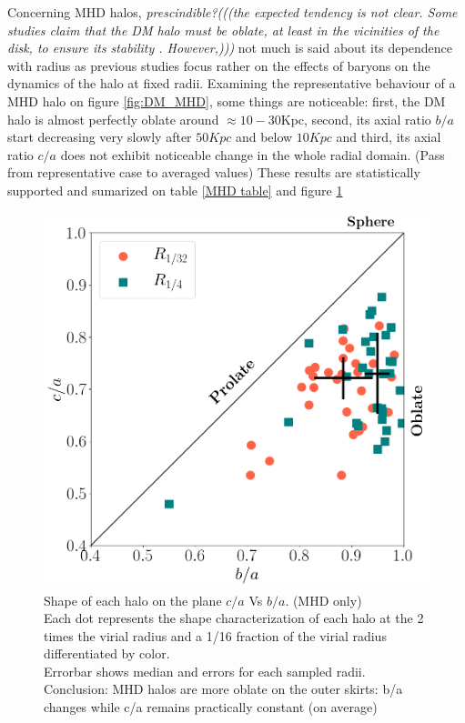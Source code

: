 \documentclass[a4paper,fleqn,usenatbib]{mnras}
\begin{document}
Concerning MHD halos, \textit{prescindible?(((the expected tendency is
  not clear. Some studies claim that the DM halo must be oblate, at
  least in the vicinities of the disk, to ensure its stability
  \cite{disk stability}. However,)))} not much is said about its
dependence with radius as previous studies focus rather on the effects
of baryons on the dynamics of the halo at fixed radii. Examining the
representative behaviour of a MHD halo on figure \ref{fig:DM_MHD},
some things are noticeable: first, the DM halo is almost perfectly
oblate around $\approx 10-30$Kpc, second, its axial ratio $b/a$ start
decreasing very slowly after $50Kpc$ and below $10Kpc$ and third, its
axial ratio $c/a$ does not exhibit noticeable change in the whole
radial domain. (Pass from representative case to averaged values)
These results are statistically supported and sumarized on table
\ref{MHD table} and figure \ref{fig:Triax_MHD} 

\begin{figure}
  \centering
 \includegraphics[width=0.9\columnwidth]{./pics/Triaxial_Plane/Triax_MHD.png}
  \hfill
  \caption{Shape of each halo on the plane $c/a$ Vs $b/a$. (MHD only)\\
   Each dot represents the shape characterization of each halo at the 2 times the virial radius and a  1/16 fraction of the virial radius differentiated by color.\\   
  Errorbar shows median and errors for each sampled radii.\\
  Conclusion: MHD halos are more oblate on the outer skirts: b/a changes while c/a remains practically constant (on average) } 
  \label{fig:Triax_MHD}
\end{figure}
\end{document}
